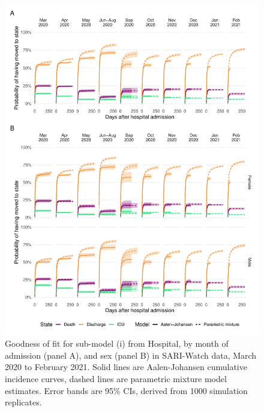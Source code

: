 \begin{figure}[htbp!]
    \centering
    \includegraphics[width=\textwidth]{sari_gof_hosp.pdf}
    \caption[Goodness of fit for from Hospital sub-model in SARI-Watch data, March 2020 to February 2021]{Goodness of fit for sub-model (i) from Hospital, by month of admission (panel A), and sex (panel B) in SARI-Watch data, March 2020 to February 2021. Solid lines are Aalen-Johansen cumulative incidence curves, dashed lines are parametric mixture model estimates. Error bands are 95\% CIs, derived from 1000 simulation replicates.}\label{fig:sari-gof-hosp}
\end{figure}

